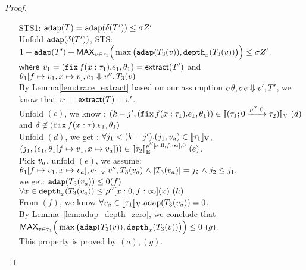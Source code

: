 \begin{proof}
\begin{mainitem}
\begin{enumerate}
\item [STS1:] $\adap(\tr) = \adap(\trop(\tr') )  \leq \ienv \nnatA'
  $\\
Unfold $\adap(\trop(\tr') ) $, STS:\\
 $1+ \adap(\tr') + \textsf{MAX}_{\valr \in \type_1} \Big(
                              \max \big(\adap(\tr_3 (\valr) ),
                              \ddep{x}(\tr_3(\valr)) \big) \Big) \leq
                              \ienv \nnatA' $. \\
      $\mathsf{where}$   $\valr_1 = (\efix f(x: \type_1). \expr_1, \env_1 ) =
                       \mathsf{extract}(\tr') $ and $  \env_1[f \mapsto
                       \valr_1, x \mapsto \valr], \expr_1 \bigstep
                       \valr'', \tr_3(\valr)  $\\
  By Lemma\ref{lem:trace_extract} based on our assumption $\ienv \env, \ienv \expr \bigstep \valr', \tr'$,  we know that $\valr_1 =
                       \mathsf{extract}(\tr) = v' $.\\
 Unfold $(c)$, we know : $(\stepiA - j',  (\efix f(x: \type_1). \expr_1, \env_1 ) ) \in \lrv{  (\tarr{ \type_1}{
      \type_2 }{0}{\dmap''}{0}) }~(d) $  and $ \delta \not\in  (\efix
  f(x: \type). \expr_1, \env_1 ) $  \\
  Unfold $(d)$, we get : $ \forall j_1 < (\stepiA-j'). (\stepiB_1,
  \valr_a) \in \lrv{\type_1} $, $  ( \stepiB_1, ( \expr_1 ,\env_1[f \mapsto
                       \valr_1, x \mapsto \valr_a]) )\in
                       \lre{\dmap''[x:0,f:\infty]}{0}{\type_2}~(e) $.\\  
   Pick $\valr_a$, unfold $(e)$, we assume:  $ \env_1[f \mapsto
                       \valr_1, x \mapsto \valr_a], \expr_1 \bigstep
                       \valr'', \tr_3(\valr_a)  \conj |\tr_3(\valr_a)|
                       = j_2 \conj j_2 \leq j_1.$
                       \\
   we get: $ \adap(\tr_3(\valr_a)) \leq 0 (f)$ \\
             $ \forall x \in \ddep{x}(\tr_3(\valr_a)) \leq
             \dmap''[x:0,f:\infty](x) ~(h)$ \\

  From $(f)$, we know $\forall \valr_a \in
  \lrv{\type_1}. \adap(\tr_3(\valr_a)) =0$. \\
 By Lemma~\ref{lem:adap_depth_zero}, we conclude that $ \textsf{MAX}_{\valr \in \type_1} \Big(
                              \max \big(\adap(\tr_3 (\valr) ),
                              \ddep{x}(\tr_3(\valr)) \big) \Big) \leq 0~(g) $.\\
           This property is proved by $(a),(g)$.


\end{enumerate}
\end{mainitem}
\end{proof}

